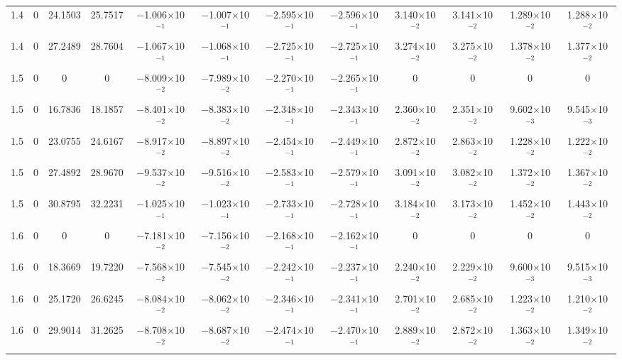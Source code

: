\documentclass[aps,prd,twocolumn,showpacs,groupedaddress,nofootinbib]{revtex4}
\begin{document}
\begin{widetext}
\begin{table}[h]
\begin{tabular}{|c|c|c|c|c|c|c|c|c|c|c|c|}
  1.4&  0& 24.1503& 25.7517& $-$1.006$\times$10$^{-1}$& $-$1.007$\times$10$^{-1}$& $-$2.595$\times$10$^{-1}$& $-$2.596$\times$10$^{-1}$&  3.140$\times$10$^{-2}$&  3.141$\times$10$^{-2}$&  1.289$\times$10$^{-2}$&  1.288$\times$10$^{-2}$\\
  1.4&  0& 27.2489& 28.7604& $-$1.067$\times$10$^{-1}$& $-$1.068$\times$10$^{-1}$& $-$2.725$\times$10$^{-1}$& $-$2.725$\times$10$^{-1}$&  3.274$\times$10$^{-2}$&  3.275$\times$10$^{-2}$&  1.378$\times$10$^{-2}$&  1.377$\times$10$^{-2}$\\
  1.5&  0&  0&  0& $-$8.009$\times$10$^{-2}$& $-$7.989$\times$10$^{-2}$& $-$2.270$\times$10$^{-1}$& $-$2.265$\times$10$^{-1}$&  0&  0&  0&  0\\
  1.5&  0& 16.7836& 18.1857& $-$8.401$\times$10$^{-2}$& $-$8.383$\times$10$^{-2}$& $-$2.348$\times$10$^{-1}$& $-$2.343$\times$10$^{-1}$&  2.360$\times$10$^{-2}$&  2.351$\times$10$^{-2}$&  9.602$\times$10$^{-3}$&  9.545$\times$10$^{-3}$\\
  1.5&  0& 23.0755& 24.6167& $-$8.917$\times$10$^{-2}$& $-$8.897$\times$10$^{-2}$& $-$2.454$\times$10$^{-1}$& $-$2.449$\times$10$^{-1}$&  2.872$\times$10$^{-2}$&  2.863$\times$10$^{-2}$&  1.228$\times$10$^{-2}$&  1.222$\times$10$^{-2}$\\
  1.5&  0& 27.4892& 28.9670& $-$9.537$\times$10$^{-2}$& $-$9.516$\times$10$^{-2}$& $-$2.583$\times$10$^{-1}$& $-$2.579$\times$10$^{-1}$&  3.091$\times$10$^{-2}$&  3.082$\times$10$^{-2}$&  1.372$\times$10$^{-2}$&  1.367$\times$10$^{-2}$\\
  1.5&  0& 30.8795& 32.2231& $-$1.025$\times$10$^{-1}$& $-$1.023$\times$10$^{-1}$& $-$2.733$\times$10$^{-1}$& $-$2.728$\times$10$^{-1}$&  3.184$\times$10$^{-2}$&  3.173$\times$10$^{-2}$&  1.452$\times$10$^{-2}$&  1.443$\times$10$^{-2}$\\
  1.6&  0&  0&  0& $-$7.181$\times$10$^{-2}$& $-$7.156$\times$10$^{-2}$& $-$2.168$\times$10$^{-1}$& $-$2.162$\times$10$^{-1}$&  0&  0&  0&  0\\
  1.6&  0& 18.3669& 19.7220& $-$7.568$\times$10$^{-2}$& $-$7.545$\times$10$^{-2}$& $-$2.242$\times$10$^{-1}$& $-$2.237$\times$10$^{-1}$&  2.240$\times$10$^{-2}$&  2.229$\times$10$^{-2}$&  9.600$\times$10$^{-3}$&  9.515$\times$10$^{-3}$\\
  1.6&  0& 25.1720& 26.6245& $-$8.084$\times$10$^{-2}$& $-$8.062$\times$10$^{-2}$& $-$2.346$\times$10$^{-1}$& $-$2.341$\times$10$^{-1}$&  2.701$\times$10$^{-2}$&  2.685$\times$10$^{-2}$&  1.223$\times$10$^{-2}$&  1.210$\times$10$^{-2}$\\
  1.6&  0& 29.9014& 31.2625& $-$8.708$\times$10$^{-2}$& $-$8.687$\times$10$^{-2}$& $-$2.474$\times$10$^{-1}$& $-$2.470$\times$10$^{-1}$&  2.889$\times$10$^{-2}$&  2.872$\times$10$^{-2}$&  1.363$\times$10$^{-2}$&  1.349$\times$10$^{-2}$\\

\end{tabular}
\end{table}
\end{widetext}
\end{document}
